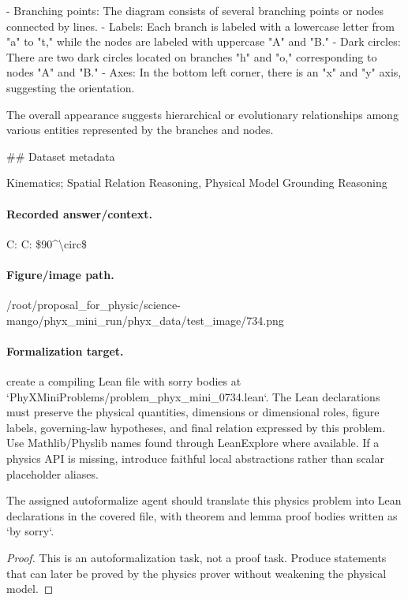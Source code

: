 - Branching points: The diagram consists of several branching points or nodes connected by lines.
- Labels: Each branch is labeled with a lowercase letter from "a" to "t," while the nodes are labeled with uppercase "A" and "B."
- Dark circles: There are two dark circles located on branches "h" and "o," corresponding to nodes "A" and "B."
- Axes: In the bottom left corner, there is an "x" and "y" axis, suggesting the orientation.

The overall appearance suggests hierarchical or evolutionary relationships among various entities represented by the branches and nodes.

\#\# Dataset metadata

Kinematics; Spatial Relation Reasoning, Physical Model Grounding Reasoning

\paragraph{Recorded answer/context.}
C: C: \$90\textasciicircum{}\textbackslash{}circ\$

\paragraph{Figure/image path.}
/root/proposal\_for\_physic/science-mango/phyx\_mini\_run/phyx\_data/test\_image/734.png

\paragraph{Formalization target.}
create a compiling Lean file with sorry bodies at `PhyXMiniProblems/problem\_phyx\_mini\_0734.lean`. The Lean declarations must preserve the physical quantities, dimensions or dimensional roles, figure labels, governing-law hypotheses, and final relation expressed by this problem.
Use Mathlib/Physlib names found through LeanExplore where available. If a physics API is missing, introduce faithful local abstractions rather than scalar placeholder aliases.

\begin{theorem}
\label{thm:physics:phyx_mini_0734:target}
The assigned autoformalize agent should translate this physics problem into Lean declarations in the covered file, with theorem and lemma proof bodies written as `by sorry`.
\end{theorem}
\begin{proof}
This is an autoformalization task, not a proof task. Produce statements that can later be proved by the physics prover without weakening the physical model.
\end{proof}

